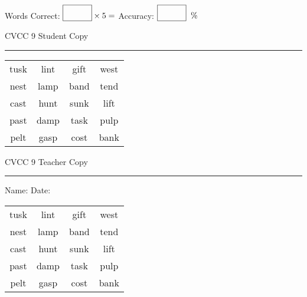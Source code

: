 \documentclass{memoir}
\begin{document}
\small

Words Correct: $\fbox{\phantom{\huge 100}} \times 5 = $ Accuracy: $\fbox{\phantom{\huge 100}}\;\; \%$ 

\vfill

\newpage


\footnotesize \noindent
CVCC 9 \hfill Student Copy
\smallskip
\hrule

\Large

\setlength{\tabcolsep}{14pt}
\def\arraystretch{3}

{\selectfont


\begin{vplace}[0.5]
\begin{center}
\begin{tabular}{cccc}
tusk & lint & gift & west \\
nest & lamp & band & tend \\
cast & hunt & sunk & lift \\
past & damp & task & pulp \\
pelt & gasp & cost & bank \\
\end{tabular}
\end{center}
\end{vplace}

}

\newpage

\footnotesize \noindent
CVCC 9 \hfill Teacher Copy
\smallskip
\hrule

\small

\vfill

\noindent
Name: \underline{\hspace{1.75in}} \hfill Date: \underline{\hspace{1in}}

\Large

{\selectfont


\begin{vplace}[0.5]
\begin{center}
\begin{tabular}{cccc}
tusk & lint & gift & west \\
nest & lamp & band & tend \\
cast & hunt & sunk & lift \\
past & damp & task & pulp \\
pelt & gasp & cost & bank \\
\end{tabular}
\end{center}
\end{vplace}



}
\end{document}
